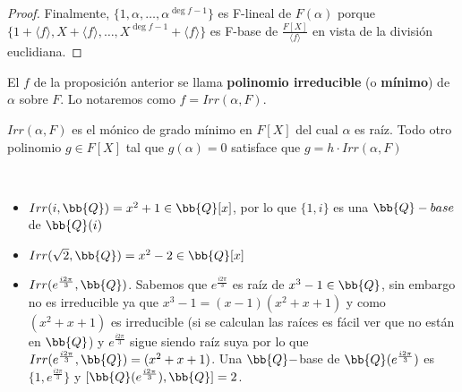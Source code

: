 \begin{prop}
\begin{proof}
        Finalmente, $\{1, \alpha, \dots, \alpha^{\deg f -1}\}$ es F-lineal de $F(\alpha)$ porque $\{1+\langle f \rangle, X + \langle f \rangle, \dots, X^{\deg f -1} + \langle f \rangle\}$ es F-base de $\frac{F[X]}{\langle f \rangle}$ en vista de la división euclidiana.
    \end{proof}
\end{prop}

\begin{definicion}
    El $f$ de la proposición anterior se llama \textbf{polinomio irreducible} (o \textbf{mínimo}) de $\alpha$ sobre $F$. Lo notaremos como $f=Irr(\alpha, F)$.
\end{definicion}

\begin{observacion}
    $Irr(\alpha, F)$ es el mónico de grado mínimo en $F[X]$ del cual $\alpha$ es raíz. Todo otro polinomio $g\in F[X]$ tal que $g(\alpha)=0$ satisface que $g = h \cdot  Irr(\alpha, F)$
\end{observacion}

\begin{ejemplo}\
    \begin{itemize}
        \item $Irr(i,\bb{Q}) = x^2 +1\in \bb{Q}[x]$, por lo que $\{1,i\}$ es una $\bb{Q}-base$ de $\bb{Q}(i)$
        \item $Irr(\sqrt{2}, \bb{Q}) = x^2 -2\in \bb{Q}[x]$
        \item $Irr(e^{\frac{i2\pi}{3}}, \bb{Q})$. Sabemos que $e^{\frac{i2\pi}{3}}$ es raíz de $x^3-1\in \bb{Q}$, sin embargo no es irreducible ya que $x^3 -1 = (x-1)(x^2+x+1)$ y como $(x^2+x+1)$ es irreducible (si se calculan las raíces es fácil ver que no están en $\bb{Q}$) y $e^{\frac{i2\pi}{3}}$ sigue siendo raíz suya por lo que $Irr(e^{\frac{i2\pi}{3}}, \bb{Q}) = (x^2+x+1)$. Una $\bb{Q}-$base de $\bb{Q}(e^{\frac{i2\pi}{3}})$ es $\{1, e^{\frac{i2\pi}{3}}\}$ y $[\bb{Q}(e^{\frac{i2\pi}{3}}), \bb{Q}]=2$.
    \end{itemize}
\end{ejemplo}

